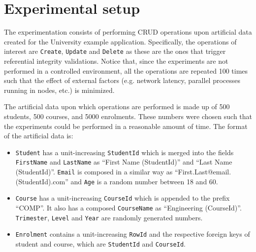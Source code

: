 \section{Experimental setup}\label{sexp:ExperimentalSetup}



The experimentation consists of performing \ac{CRUD} operations upon artificial
data created for the University example application. Specifically, the
operations of interest are \texttt{Create}, \texttt{Update} and \texttt{Delete}
as these are the ones that trigger referential integrity validations. Notice
that, since the experiments are not performed in a controlled environment, all
the operations are repeated 100 times such that the effect of external factors
(e.g. network latency, parallel processes running in nodes, etc.)  is minimized.


The artificial data upon which operations are performed  is made up of 500
students, 500 courses, and 5000 enrolments. These numbers were chosen such that
the experiments could be performed in a reasonable amount of time. 
The format of the artificial data is:

	\begin{itemize}
		\item \texttt{Student} has a
		unit-increasing \texttt{StudentId}  which is merged into the fields \texttt{FirstName}
		 and \texttt{LastName} as ``First Name (StudentId)'' and ``Last Name
		(StudentId)''.  \texttt{Email} is composed in a similar way as
		``First.Last@email.(StudentId).com'' and \texttt{Age} is a random number
		between 18 and 60.
		
		\item  \texttt{Course} has a unit-increasing \texttt{CourseId} which is
		appended to the prefix ``COMP''.  It also has a composed \texttt{CourseName}
		as ``Engineering (CourseId)''.  \texttt{Trimester}, \texttt{Level}
		and \texttt{Year} are randomly generated numbers.
		
		\item  \texttt{Enrolment} contains a unit-increasing \texttt{RowId}  and the
		respective foreign keys of student and course,  which are \texttt{StudentId}
		and \texttt{CourseId}. 
	\end{itemize}
 
